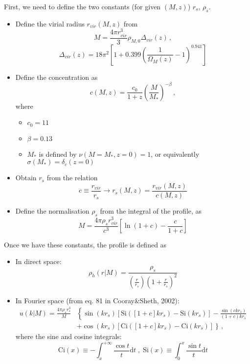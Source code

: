 \documentclass[10pt,a4paper]{article}
\begin{document}
First, we need to define the two constants (for given $(M,z)$) $r_s$, $\rho_s$.
\begin{itemize}
\item Define the virial radius $r_{vir}(M,z)$ from
\begin{equation}
M = \frac{4 \pi r_{vir}^3}{3}\rho_{M,0} \Delta_{vir}(z) \, ,
\end{equation}
\begin{equation}
\Delta_{vir}(z) = 18\pi^2 \left[ 1 + 0.399\left( \frac{1}{\Omega_M(z)} - 1 \right)^{0.941} \right]
\end{equation}
\item Define the concentration as
\begin{equation}
c(M,z) = \frac{c_0}{1+z} \left( \frac{M}{M_*} \right)^{-\beta} \, ,
\end{equation}
where
\begin{itemize}
\item $c_0 = 11$
\item $\beta = 0.13$
\item $M_*$ is defined by $\nu(M=M_*, z=0) = 1$, or equivalently $\sigma(M_*) = \delta_c(z=0)$
\end{itemize}
\item Obtain $r_s$ from the relation
\begin{equation}
c \equiv \frac{r_{vir}}{r_s} \rightarrow r_s(M,z) = \frac{r_{vir}(M,z)}{c(M,z)}
\end{equation}
\item Define the normalisation $\rho_s$ from the integral of the profile, as
\begin{equation}
M = \frac{4 \pi \rho_s r_{vir}^3}{c^3} \left[\ln (1+c) - \frac{c}{1+c} \right]
\end{equation}
\end{itemize}


Once we have these constants, the profile is defined as
\begin{itemize}
\item In direct space:
\begin{equation}
\rho_h(r|M) = \frac{\rho_s}{\left(\frac{r}{r_s}\right)\left(1 + \frac{r}{r_s}\right)^2}
\end{equation}
\item In Fourier space (from eq. 81 in Cooray\&Sheth, 2002):
\begin{eqnarray}
u(k|M) = \frac{4 \pi \rho_s r_s^3}{M} & \left\lbrace  \sin(kr_s)\left[\mathrm{Si}\left([1+c]kr_s\right) - \mathrm{Si}(kr_s)\right] - \frac{\sin(ckr_s)}{(1+c)kr_s} \right. \\
& \left.  + \cos(kr_s)\left[\mathrm{Ci}\left([1+c]kr_s\right) - \mathrm{Ci}(kr_s)\right]\right\rbrace \, ,
\end{eqnarray}
where the sine and cosine integrals:
\begin{equation}
\mathrm{Ci}(x) \equiv - \int_x^{+\infty} \frac{\cos t}{t} \mathrm{d} t \; , \;
\mathrm{Si}(x) \equiv \int_0^x \frac{\sin t}{t} \mathrm{d} t
\end{equation}
\end{itemize}
\end{document}
